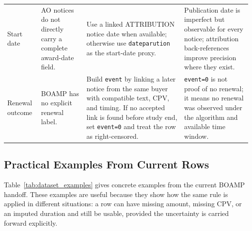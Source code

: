\documentclass[12pt, a4paper]{article}
\begin{document}
\begin{landscape}
\begin{table}[p]
\begin{tabularx}{\linewidth}{@{}P{3.8cm}P{4.2cm}Y Y@{}}
Start date & AO notices do not directly carry a complete award-date field.
& Use a linked ATTRIBUTION notice date when available; otherwise use \texttt{dateparution} as the start-date proxy.
& Publication date is imperfect but observable for every notice; attribution back-references improve precision where they exist. \\[4pt]

Renewal outcome & BOAMP has no explicit renewal label.
& Build \texttt{event} by linking a later notice from the same buyer with compatible text, CPV, and timing. If no accepted link is found before study end, set \texttt{event=0} and treat the row as right-censored.
& \texttt{event=0} is not proof of no renewal; it means no renewal was observed under the algorithm and available time window. \\
\bottomrule
\end{tabularx}
\normalsize
\end{table}
\end{landscape}

\subsection{Practical Examples From Current Rows}

Table~\ref{tab:dataset_examples} gives concrete examples from the current
BOAMP handoff. These examples are useful because they show how the same rule
is applied in different situations: a row can have missing amount, missing CPV,
or an imputed duration and still be usable, provided the uncertainty is carried
forward explicitly.
\end{document}
